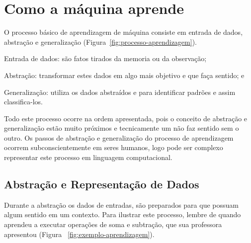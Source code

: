 \section{Como a máquina aprende}
\label{sec:howdoesmachinelearn}

O processo básico de aprendizagem de máquina consiste em entrada de dados, abstração e generalização (Figura~\ref{fig:processo-aprendizagem}).
\begin{alineas}
	\item Entrada de dados: são fatos tirados da memoria ou da observação;
	\item Abstração: transformar estes dados em algo mais objetivo e que faça sentido; e
	\item Generalização: utiliza os dados abstraídos e para  identificar padrões e assim classifica-los.			
\end{alineas}

\begin{figure}[h!]
	\centering
\end{figure}

Todo este processo ocorre na ordem apresentada, pois o conceito de abstração e generalização estão muito próximos e tecnicamente um não faz sentido sem o outro. Os passos de abstração e generalização do processo de aprendizagem ocorrem subconscientemente em seres humanos, logo pode ser complexo representar este processo em linguagem computacional.


\subsection{Abstração e Representação de Dados}
\label{subsec:abs-representacao-dados}

Durante a abstração os dados de entradas, são preparados para que possuam algum sentido em um contexto.
Para ilustrar este processo, lembre de quando aprendeu a executar operações de soma e subtração, que sua professora apresentou (Figura ~\ref{fig:exemplo-aprendizagem}).

